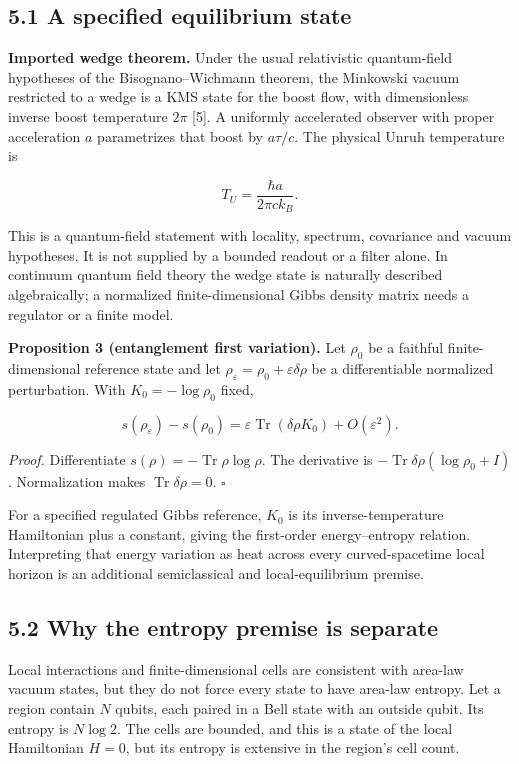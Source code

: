 \documentclass[
  11pt,
  a4paper,
]{article}
\begin{document}
\subsection{5.1 A specified equilibrium state}\label{a-specified-equilibrium-state}

\textbf{Imported wedge theorem.} Under the usual relativistic quantum-field hypotheses of the Bisognano--Wichmann theorem, the Minkowski vacuum restricted to a wedge is a KMS state for the boost flow, with dimensionless inverse boost temperature \(2\pi\) {[}5{]}. A uniformly accelerated observer with proper acceleration \(a\) parametrizes that boost by \(a\tau/c\). The physical Unruh temperature is

\[
T_U=\frac{\hbar a}{2\pi c k_B}.
\]

This is a quantum-field statement with locality, spectrum, covariance and vacuum hypotheses. It is not supplied by a bounded readout or a filter alone. In continuum quantum field theory the wedge state is naturally described algebraically; a normalized finite-dimensional Gibbs density matrix needs a regulator or a finite model.

\textbf{Proposition 3 (entanglement first variation).} Let \(\rho_0\) be a faithful finite-dimensional reference state and let \(\rho_\varepsilon=\rho_0+\varepsilon\delta\rho\) be a differentiable normalized perturbation. With \(K_0=-\log\rho_0\) fixed,

\[
s(\rho_\varepsilon)-s(\rho_0)
=\varepsilon\operatorname{Tr}(\delta\rho K_0)+O(\varepsilon^2).
\]

\emph{Proof.} Differentiate \(s(\rho)=-\operatorname{Tr}\rho\log\rho\). The derivative is \(-\operatorname{Tr}\delta\rho(\log\rho_0+I)\). Normalization makes \(\operatorname{Tr}\delta\rho=0\). \(\square\)

For a specified regulated Gibbs reference, \(K_0\) is its inverse-temperature Hamiltonian plus a constant, giving the first-order energy--entropy relation. Interpreting that energy variation as heat across every curved-spacetime local horizon is an additional semiclassical and local-equilibrium premise.

\subsection{5.2 Why the entropy premise is separate}\label{why-the-entropy-premise-is-separate}

Local interactions and finite-dimensional cells are consistent with area-law vacuum states, but they do not force every state to have area-law entropy. Let a region contain \(N\) qubits, each paired in a Bell state with an outside qubit. Its entropy is \(N\log2\). The cells are bounded, and this is a state of the local Hamiltonian \(H=0\), but its entropy is extensive in the region's cell count.
\end{document}
